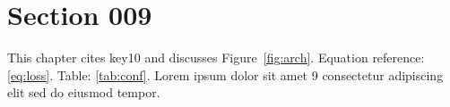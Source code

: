 \section{Section 009}\label{sec:s9}
This chapter cites key10 and discusses Figure~\ref{fig:arch}.
Equation reference: \eqref{eq:loss}. Table: \ref{tab:conf}.
Lorem ipsum dolor sit amet 9 consectetur adipiscing elit sed do eiusmod tempor.
